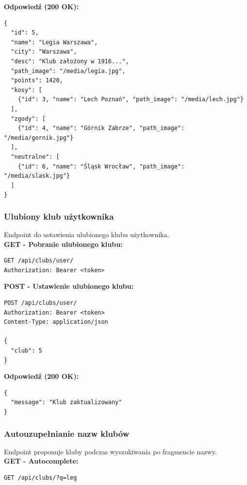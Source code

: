 \documentclass[a4paper,12pt]{article}
\begin{document}
\vspace{0.5cm}

\textbf{Odpowiedź (200 OK):}
\begin{lstlisting}
{
  "id": 5,
  "name": "Legia Warszawa",
  "city": "Warszawa",
  "desc": "Klub założony w 1916...",
  "path_image": "/media/legia.jpg",
  "points": 1420,
  "kosy": [
    {"id": 3, "name": "Lech Poznań", "path_image": "/media/lech.jpg"}
  ],
  "zgody": [
    {"id": 4, "name": "Górnik Zabrze", "path_image": "/media/gornik.jpg"}
  ],
  "neutralne": [
    {"id": 6, "name": "Śląsk Wrocław", "path_image": "/media/slask.jpg"}
  ]
}
\end{lstlisting}

\newpage

\subsubsection{Ulubiony klub użytkownika}

Endpoint do ustawienia ulubionego klubu użytkownika. \\

\textbf{GET - Pobranie ulubionego klubu:}
\begin{lstlisting}
GET /api/clubs/user/
Authorization: Bearer <token>
\end{lstlisting}

\vspace{0.5cm}

\textbf{POST - Ustawienie ulubionego klubu:}
\begin{lstlisting}
POST /api/clubs/user/
Authorization: Bearer <token>
Content-Type: application/json

{
  "club": 5
}
\end{lstlisting}

\vspace{0.5cm}

\textbf{Odpowiedź (200 OK):}
\begin{lstlisting}
{
  "message": "Klub zaktualizowany"
}
\end{lstlisting}

\newpage

\subsubsection{Autouzupełnianie nazw klubów}

Endpoint proponuje kluby podczas wyszukiwania po fragmencie nazwy. \\

\textbf{GET - Autocomplete:}
\begin{lstlisting}
GET /api/clubs/?q=leg
\end{lstlisting}
\end{document}

